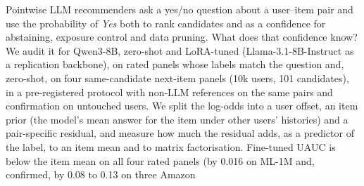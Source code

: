 Pointwise LLM recommenders ask a yes/no question about a user--item pair and use the probability of \emph{Yes} both to rank
candidates and as a confidence for abstaining, exposure control and data pruning. What does that confidence know? We audit it
for Qwen3-8B, zero-shot and LoRA-tuned (Llama-3.1-8B-Instruct as a replication backbone), on rated panels whose labels match the
question and, zero-shot, on four same-candidate next-item panels (10k users, 101 candidates), in a pre-registered protocol with
non-LLM references on the same pairs and confirmation on untouched users. We split the log-odds into a user offset, an item prior
(the model's mean answer for the item under other users' histories) and a pair-specific residual, and measure how much the
residual adds, as a predictor of the label, to an item mean and to matrix factorisation.
Fine-tuned UAUC is below the item mean on all four rated panels (by 0.016 on ML-1M and, confirmed, by 0.08 to 0.13 on three Amazon
